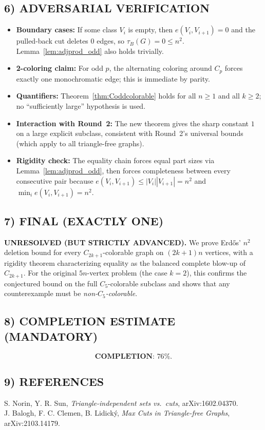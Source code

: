 \subsection*{6) ADVERSARIAL VERIFICATION}
\begin{itemize}
\item \textbf{Boundary cases:} If some class $V_i$ is empty, then $e(V_i,V_{i+1})=0$ and the pulled-back
      cut deletes $0$ edges, so $\tau_B(G)=0\le n^2$. Lemma~\ref{lem:adjprod_odd} also holds trivially.
\item \textbf{2-coloring claim:} For odd $p$, the alternating coloring around $C_p$ forces exactly one
      monochromatic edge; this is immediate by parity.
\item \textbf{Quantifiers:} Theorem~\ref{thm:Coddcolorable} holds for all $n\ge 1$ and all $k\ge 2$;
      no ``sufficiently large'' hypothesis is used.
\item \textbf{Interaction with Round~2:} The new theorem gives the sharp constant $1$ on a large explicit
      subclass, consistent with Round~2's universal bounds (which apply to all triangle-free graphs).
\item \textbf{Rigidity check:} The equality chain forces equal part sizes via Lemma~\ref{lem:adjprod_odd},
      then forces completeness between every consecutive pair because $e(V_i,V_{i+1})\le |V_i||V_{i+1}|=n^2$
      and $\min_i e(V_i,V_{i+1})=n^2$.
\end{itemize}

\subsection*{7) FINAL (EXACTLY ONE)}
\textbf{UNRESOLVED (BUT STRICTLY ADVANCED).}
We prove Erd\H{o}s' $n^2$ deletion bound for every $C_{2k+1}$-colorable graph on $(2k+1)n$ vertices,
with a rigidity theorem characterizing equality as the balanced complete blow-up of $C_{2k+1}$.
For the original $5n$-vertex problem (the case $k=2$), this confirms the conjectured bound on the full
$C_5$-colorable subclass and shows that any counterexample must be \emph{non-$C_5$-colorable}.

\subsection*{8) COMPLETION ESTIMATE (MANDATORY)}
\[
\textbf{COMPLETION: }76\%.
\]

\subsection*{9) REFERENCES}
S. Norin, Y. R. Sun, \emph{Triangle-independent sets vs.\ cuts}, arXiv:1602.04370.\\
J. Balogh, F. C. Clemen, B. Lidick\'y, \emph{Max Cuts in Triangle-free Graphs}, arXiv:2103.14179.


